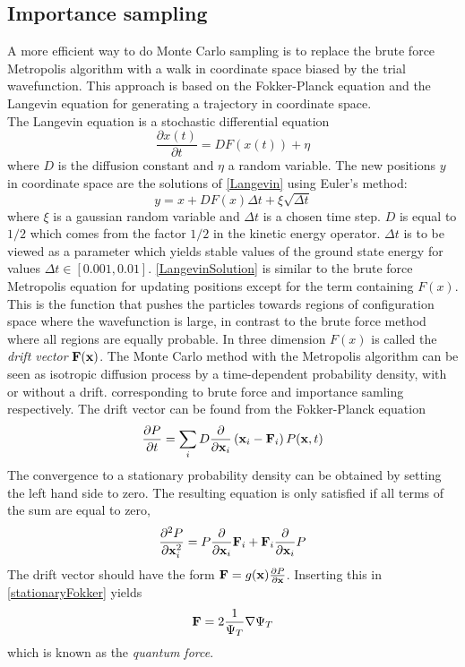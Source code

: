 \documentclass[english, a4paper]{article}
\begin{document}
\subsection*{Importance sampling}

A more efficient way to do Monte Carlo sampling is to replace the brute force Metropolis algorithm
with a walk in coordinate space biased by the trial wavefunction. This approach is based on the 
Fokker-Planck equation and the Langevin equation for generating a trajectory in coordinate space. \\

\noindent The Langevin equation is a stochastic differential equation
\begin{equation}
 \frac{\partial x(t)}{\partial t} = D F(x(t)) + \eta
 \label{Langevin}
\end{equation}
where $D$ is the diffusion constant and $\eta$ a random variable.
The new positions $y$ in coordinate space are the solutions of \eqref{Langevin} using Euler's method:
\begin{equation}
 y = x + DF(x)\Delta t + \xi \sqrt{\Delta t}
 \label{LangevinSolution}
\end{equation}
where $\xi$ is a gaussian random variable and $\Delta t$ is a chosen time step. $D$ is equal to $1/2$
which comes from the factor $1/2$ in the kinetic energy operator. $\Delta t$ is to be viewed as a
parameter which yields stable values of the ground state energy for values $\Delta t \in [0.001, 0.01]$.
\eqref{LangevinSolution} is similar to the brute force Metropolis equation for updating positions except for the
term  containing $F(x)$. This is the function that pushes the particles towards regions of configuration space
where the wavefunction is large, in contrast to the brute force method where all regions are equally probable. 
In three dimension $F(x)$ is called the \textit{drift vector} ${\bf F}({\bf x})$.
The Monte Carlo method with the Metropolis algorithm can be seen as isotropic diffusion process by a time-dependent 
probability density, with or without a drift. corresponding to brute force and importance samling respectively.
The drift vector can be found from the
Fokker-Planck equation
\begin{equation}
 \frac{\partial P}{\partial t} = \sum_i D \frac{\partial}{\partial {\bf x}_i}
 \left( {\bf x}_i - {\bf F}_i \right) P({\bf x}, t)
\end{equation}
The convergence to a stationary probability density can be obtained by setting the left hand side to zero. 
The resulting equation is only satisfied if all terms of the sum are equal to zero, 
\begin{equation}
 \frac{\partial^2 P}{\partial {\bf x}_i^2} = P \frac{\partial}{\partial {\bf x}_i} {\bf F}_i
 + {\bf F}_i \frac{\partial}{\partial {\bf x}_i} P
 \label{stationaryFokker}
\end{equation}
The drift vector should have the form ${\bf F} = g({\bf x}) \frac{\partial P}{\partial {\bf x}}$. Inserting this in
\eqref{stationaryFokker} yields 
\begin{equation}
 {\bf F} = 2 \frac{1}{\Psi_T} \nabla \Psi_T
\end{equation}
which is known as the \textit{quantum force}. \\
\end{document}
